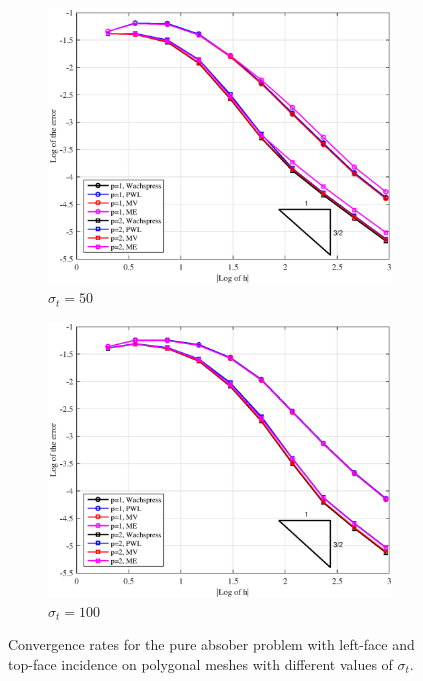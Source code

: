 \begin{figure}
{}
\vspace{1cm}
{
	\begin{subfigure}[b]{0.485\textwidth}
		\centering
		\label{subfig::PA_LeftTop_Poly_sig50}
		\includegraphics[width=\textwidth]{figures/sec_BF/PAErr_LeftTop_Poly_sig50.eps}
	\caption{$\sigma_t = 50$}
	\end{subfigure}
	\hfill
	\begin{subfigure}[b]{0.485\textwidth}
		\centering
		\label{subfig::PA_LeftTop_Poly_sig100}
		\includegraphics[width=\textwidth]{figures/sec_BF/PAErr_LeftTop_Poly_sig100.eps}
	\caption{$\sigma_t = 100$}
	\end{subfigure}
}
\caption{Convergence rates for the pure absober problem with left-face and top-face incidence on polygonal meshes with different values of $\sigma_t$.}
\label{fig::BF_Results_PA_LeftTop_Poly}
\end{figure}

